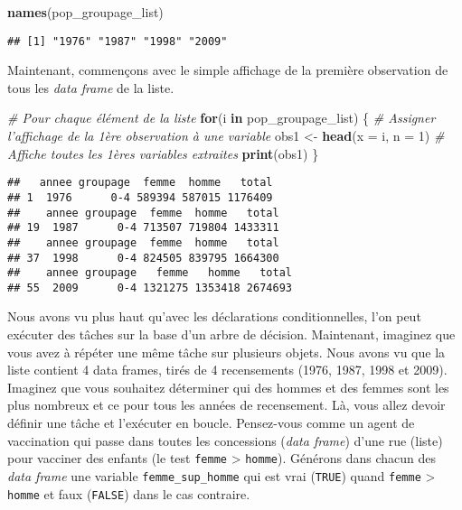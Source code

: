 \documentclass[]{book}
\newenvironment{Shaded}{\begin{snugshade}}{\end{snugshade}}
\newcommand{\KeywordTok}[1]{\textcolor[rgb]{0.13,0.29,0.53}{\textbf{#1}}}
\newcommand{\DataTypeTok}[1]{\textcolor[rgb]{0.13,0.29,0.53}{#1}}
\newcommand{\DecValTok}[1]{\textcolor[rgb]{0.00,0.00,0.81}{#1}}
\newcommand{\StringTok}[1]{\textcolor[rgb]{0.31,0.60,0.02}{#1}}
\newcommand{\CommentTok}[1]{\textcolor[rgb]{0.56,0.35,0.01}{\textit{#1}}}
\newcommand{\ControlFlowTok}[1]{\textcolor[rgb]{0.13,0.29,0.53}{\textbf{#1}}}
\newcommand{\NormalTok}[1]{#1}
\begin{document}
\begin{Shaded}
\begin{Highlighting}[]
\KeywordTok{names}\NormalTok{(pop_groupage_list)}
\end{Highlighting}
\end{Shaded}

\begin{verbatim}
## [1] "1976" "1987" "1998" "2009"
\end{verbatim}

Maintenant, commençons avec le simple affichage de la première
observation de tous les \emph{data frame} de la liste.

\begin{Shaded}
\begin{Highlighting}[]
  \CommentTok{# Pour chaque élément de la liste}
\ControlFlowTok{for}\NormalTok{(i }\ControlFlowTok{in}\NormalTok{ pop_groupage_list) \{ }
  \CommentTok{# Assigner l'affichage de la 1ère observation à une variable}
\NormalTok{  obs1 <-}\StringTok{ }\KeywordTok{head}\NormalTok{(}\DataTypeTok{x =}\NormalTok{ i, }\DataTypeTok{n =} \DecValTok{1}\NormalTok{) }
  \CommentTok{# Affiche toutes les 1ères variables extraites}
  \KeywordTok{print}\NormalTok{(obs1)}
\NormalTok{\}}
\end{Highlighting}
\end{Shaded}

\begin{verbatim}
##   annee groupage  femme  homme   total
## 1  1976      0-4 589394 587015 1176409
##    annee groupage  femme  homme   total
## 19  1987      0-4 713507 719804 1433311
##    annee groupage  femme  homme   total
## 37  1998      0-4 824505 839795 1664300
##    annee groupage   femme   homme   total
## 55  2009      0-4 1321275 1353418 2674693
\end{verbatim}

Nous avons vu plus haut qu'avec les déclarations conditionnelles, l'on
peut exécuter des tâches sur la base d'un arbre de décision. Maintenant,
imaginez que vous avez à répéter une même tâche sur plusieurs objets.
Nous avons vu que la liste contient 4 data frames, tirés de 4
recensements (1976, 1987, 1998 et 2009). Imaginez que vous souhaitez
déterminer qui des hommes et des femmes sont les plus nombreux et ce
pour tous les années de recensement. Là, vous allez devoir définir une
tâche et l'exécuter en boucle. Pensez-vous comme un agent de vaccination
qui passe dans toutes les concessions (\emph{data frame}) d'une rue
(liste) pour vacciner des enfants (le test \texttt{femme} \textgreater{}
\texttt{homme}). Générons dans chacun des \emph{data frame} une variable
\texttt{femme\_sup\_homme} qui est vrai (\texttt{TRUE}) quand
\texttt{femme} \textgreater{} \texttt{homme} et faux (\texttt{FALSE})
dans le cas contraire.
\end{document}
